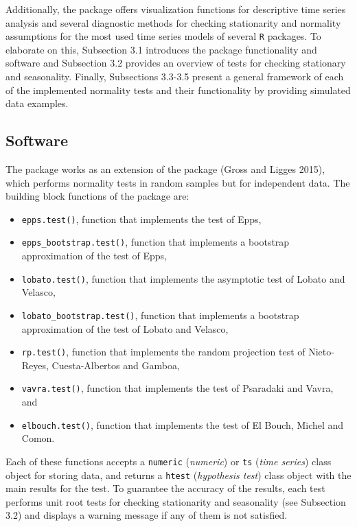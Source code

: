 Additionally, the package offers visualization functions for descriptive time series analysis and several diagnostic methods for checking stationarity and normality assumptions for the most used time series models of several \texttt{R} packages. To elaborate on this, Subsection 3.1 introduces the package functionality and software and Subsection 3.2 provides an overview of tests for checking stationary and seasonality. Finally, Subsections 3.3-3.5 present a general framework of each of the implemented normality tests and their functionality by providing simulated data examples.

\hypertarget{software}{%
\subsection{Software}\label{software}}

The package works as an extension of the  package (Gross and Ligges 2015), which performs normality tests in random samples but for independent data. The building block functions of the  package are:

\begin{itemize}
\item
  \texttt{epps.test()}, function that implements the test of Epps,
\item
  \texttt{epps\_bootstrap.test()}, function that implements a bootstrap approximation of the test of Epps,
\item
  \texttt{lobato.test()}, function that implements the asymptotic test of Lobato and Velasco,
\item
  \texttt{lobato\_bootstrap.test()}, function that implements a bootstrap approximation of the test of Lobato and Velasco,
\item
  \texttt{rp.test()}, function that implements the random projection test of Nieto-Reyes, Cuesta-Albertos and Gamboa,
\item
  \texttt{vavra.test()}, function that implements the test of Psaradaki and Vavra, and
\item
  \texttt{elbouch.test()}, function that implements the test of El Bouch, Michel and Comon.
\end{itemize}

Each of these functions accepts a \texttt{numeric} (\emph{numeric}) or \texttt{ts} (\emph{time series}) class object for storing data, and returns a \texttt{htest} (\emph{hypothesis test}) class object with the main results for the test. To guarantee the accuracy of the results, each test performs unit root tests for checking stationarity and seasonality (see Subsection 3.2) and displays a warning message if any of them is not satisfied.

